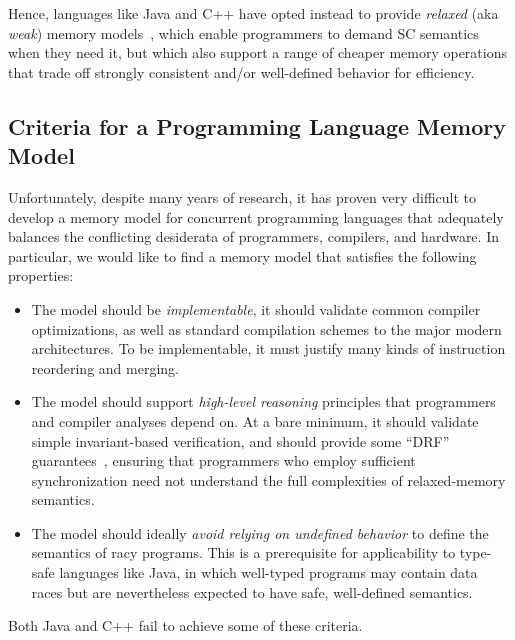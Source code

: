 Hence, languages like Java and C++ have opted instead to provide
\emph{relaxed} (aka \emph{weak}) memory models~\cite{jmm,cppstandard},
which enable programmers to demand SC semantics when they need it, but
which also support a range of cheaper memory operations that trade off
strongly consistent and/or well-defined behavior for efficiency.

\subsection{Criteria for a Programming Language Memory Model}
\label{sec:criteria}

Unfortunately, despite many years of research, it has proven very
difficult to develop a memory model for concurrent programming
languages that adequately balances the conflicting desiderata of
programmers, compilers, and hardware.  In particular, we would like to
find a memory model that satisfies the following properties:
\vspace{-.5ex}
\begin{itemize}
\item The model should be \emph{implementable}, \ie it should validate
  common compiler optimizations, as well as standard compilation
  schemes to the major modern architectures.  To be implementable, it
  must justify many kinds of instruction reordering and merging.\\[-2.5ex]
\item The model should support \emph{high-level reasoning} principles
  that programmers and compiler analyses depend on.  At a bare
  minimum, it should validate simple invariant-based verification, and
  should provide some ``DRF'' guarantees~\cite{Adve:1990}, ensuring that
  programmers who employ sufficient synchronization need not understand
  the full complexities of relaxed-memory semantics.\\[-2.5ex]
\item The model should ideally \emph{avoid relying on undefined
    behavior} to define the semantics of racy programs.  This is a
  prerequisite for applicability to type-safe languages like Java, in
  which well-typed programs may contain data races but are
  nevertheless expected to have safe, well-defined semantics.
\end{itemize}
\vspace{-.5ex}
\mbox{}\indent Both Java and C++ fail to achieve some of these criteria.

